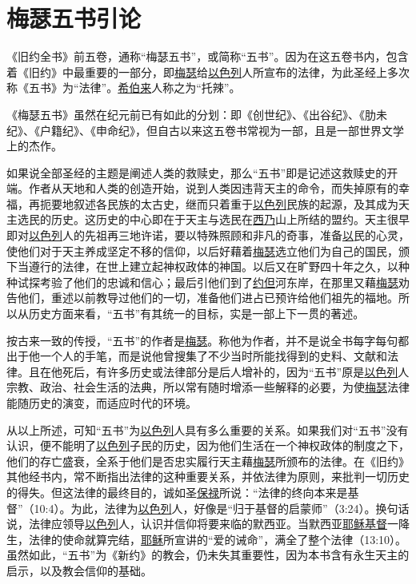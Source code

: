 \chapter*{梅瑟五书引论}


《旧约全书》前五卷，通称“梅瑟五书”，或简称“五书”。因为在这五卷书内，包含着《旧约》中最重要的一部分，即\uline{梅瑟}给\uline{以色列}人所宣布的法律，为此圣经上多次称《五书》为“法律”。\uline{希伯来}人称之为“托辣”。

《梅瑟五书》虽然在纪元前已有如此的分划：即《创世纪》、《出谷纪》、《肋未纪》、《户籍纪》、《申命纪》，但自古以来这五卷书常视为一部，且是一部世界文学上的杰作。

如果说全部圣经的主题是阐述人类的救赎史，那么“五书”即是记述这救赎史的开端。作者从天地和人类的创造开始，说到人类因违背天主的命令，而失掉原有的幸福，再扼要地叙述各民族的太古史，继而只着重于\uline{以色列}民族的起源，及其成为天主选民的历史。这历史的中心即在于天主与选民在\uline{西乃}山上所结的盟约。天主很早即对\uline{以色列}人的先祖再三地许诺，要以特殊照顾和非凡的奇事，准备\uline{以}民的心灵，使他们对于天主养成坚定不移的信仰，以后好藉着\uline{梅瑟}选立他们为自己的国民，颁下当遵行的法律，在世上建立起神权政体的神国。以后又在旷野四十年之久，以种种试探考验了他们的忠诚和信心；最后引他们到了\uline{约但}河东岸，在那里又藉\uline{梅瑟}劝告他们，重述以前教导过他们的一切，准备他们进占已预许给他们祖先的福地。所以从历史方面来看，“五书”有其统一的目标，实是一部上下一贯的著述。

按古来一致的传授，“五书”的作者是\uline{梅瑟}。称他为作者，并不是说全书每字每句都出于他一个人的手笔，而是说他曾搜集了不少当时所能找得到的史料、文献和法律。且在他死后，有许多历史或法律部分是后人增补的，因为“五书”原是\uline{以色列}人宗教、政治、社会生活的法典，所以常有随时增添一些解释的必要，为使\uline{梅瑟}法律能随历史的演变，而适应时代的环境。

从以上所述，可知“五书”为\uline{以色列}人具有多么重要的关系。如果我们对“五书”没有认识，便不能明了\uline{以色列}子民的历史，因为他们生活在一个神权政体的制度之下，他们的存亡盛衰，全系于他们是否忠实履行天主藉\uline{梅瑟}所颁布的法律。在《旧约》其他经书内，常不断指出法律的这种重要关系，并依法律为原则，来批判一切历史的得失。但这法律的最终目的，诚如圣\uline{保禄}所说：“法律的终向本来是基督”（10:4）。为此，法律为\uline{以色列}人，好像是“归于基督的启蒙师”（3:24）。换句话说，法律应领导\uline{以色列}人，认识并信仰将要来临的默西亚。当默西亚\uline{耶稣}\uline{基督}一降生，法律的使命就算完结，\uline{耶稣}所宣讲的“爱的诫命”，满全了整个法律（13:10）。虽然如此，“五书”为《新约》的教会，仍未失其重要性，因为本书含有永生天主的启示，以及教会信仰的基础。